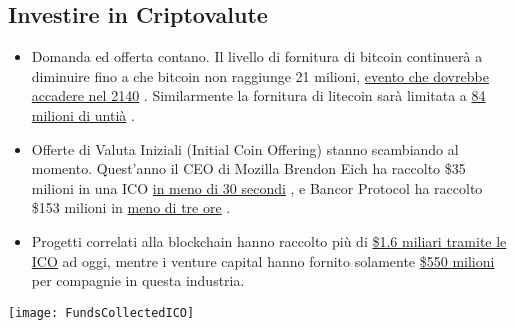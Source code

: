 \documentclass[11pt,fleqn]{book} %
\begin{document}
	\subsection{Investire in Criptovalute}
		\begin{itemize}
			\item Domanda ed offerta contano. Il livello di fornitura di bitcoin continuerà a diminuire fino
			a che bitcoin non raggiunge 21 milioni,
			\href{https://www.coindesk.com/top-10-bitcoin-myths-debunked/}{evento che dovrebbe accadere nel 2140}
			\cite{mythsDebunked}. 
			Similarmente la fornitura di litecoin sarà limitata a 
			\href{https://support.xbtce.info/Knowledgebase/Article/View/152/59/about-litecoin}{84 milioni di untià}
			\cite{ltcLimits}.
			\item Offerte di Valuta Iniziali (Initial Coin Offering) stanno scambiando al momento. Quest'anno
			il CEO di Mozilla Brendon Eich ha raccolto \$35 milioni in una ICO 
			\href{https://techcrunch.com/2017/06/01/brave-ico-35-million-30-seconds-brendan-eich/}{in meno di 30 secondi}
			\cite{techCrunch}, 
			e Bancor Protocol ha raccolto \$153 milioni in	 
			\href{https://www.google.com/search?q=Bancor+Protoco+ico&oq=Bancor+Protocol+ico&gs_l=psy-ab.3..0i13k1l2.253.542.0.578.4.3.0.0.0.0.177.320.0j2.2.0....0...1.1.64.psy-ab..3.1.176.LOjRpj0hKrM}{meno di tre ore}
			\cite{bancorProtocol}.
			\item Progetti correlati alla blockchain hanno raccolto più di 
			\href{https://www.coindesk.com/1-6-billion-all-time-ico-funding-climbs-as-record-500-million-invested-in-july/}{\$1.6 miliari tramite le ICO}
			\cite{coindeskICOAllTimeHigh} 
			ad oggi, mentre i venture capital hanno fornito solamente
			\href{http://my.pitchbook.com/?pbr=14763750}{\$550 milioni} \cite{pitchbook} per compagnie in questa industria.
		\end{itemize}
		\begin{center}
			\texttt{[image: FundsCollectedICO]}
		\end{center}
\end{document}
